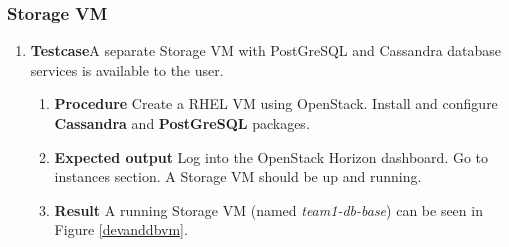\subsubsection{Storage VM}
\begin{enumerate}
\item \textbf{Testcase}\newline A separate Storage VM with PostGreSQL
  and Cassandra database services is available to the user.
  \begin{enumerate}[label={}]
  \item \textbf{Procedure}\newline
    Create a RHEL VM using OpenStack. Install and configure \textbf{Cassandra}
    and \textbf{PostGreSQL} packages.
  \item \textbf{Expected output}\newline
    Log into the OpenStack Horizon dashboard. Go to instances
    section. A Storage VM should be up and running.
  \item \textbf{Result}\newline
    A running Storage VM (named \emph{team1-db-base}) can be seen in Figure \ref{devanddbvm}.
  \end{enumerate}
\end{enumerate}


